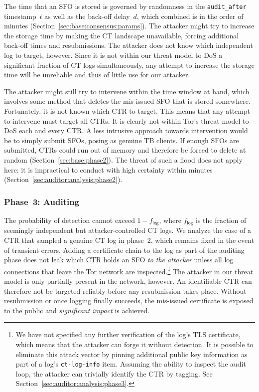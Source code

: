 The time that an SFO is stored is governed by randomness in the
\texttt{audit\_after} timestamp~$t$ as well as the back-off delay~$d$,
which combined is in the order of minutes
	(Section~\ref{sec:base:consensus:params}).
The attacker might try to increase the storage time by making the CT landscape
unavailable, forcing additional back-off times and resubmissions.  The attacker
does not know which independent log to target, however.  Since it is not within
our threat model to DoS a significant fraction of CT logs simultaneously, any
attempt to increase the storage time will be unreliable and thus of little use
for our attacker.

The attacker might still try to intervene within the time window at hand, which
involves some method that deletes the mis-issued SFO that is stored somewhere.
Fortunately, it is not known which CTR to target.
This means that any attempt to intervene must target all CTRs.  It is clearly
not within Tor's threat model to DoS each and every CTR.  A less intrusive
approach towards intervention would be to simply submit SFOs, posing as genuine
TB clients.  If enough SFOs are submitted, CTRs could run out of memory
and therefore be forced to delete at random (Section~\ref{sec:base:phase2}).
The threat of such a flood does not apply here:
	it is impractical to conduct with high certainty within minutes
	(Section~\ref{sec:auditor:analysis:phase2}).

\subsubsection{Phase~3: Auditing} \label{sec:analysis:pr:phase3}
The probability of detection cannot exceed $1-f_{\mathsf{log}}$, where
$f_{\mathsf{log}}$ is the fraction of seemingly independent but
attacker-controlled CT logs.  We analyze the case of a CTR that sampled a
genuine CT log in phase~2, which remains fixed in the event of transient errors.
Adding a certificate chain to the log as part of the auditing phase does not
leak which CTR holds an SFO \emph{to the attacker} unless all log connections
that leave the Tor network are inspected.\footnote{%
	We have not specified any further verification of the log's TLS certificate,
	which means that the attacker can forge it without detection.  It is
	possible to eliminate this attack vector by pinning additional public key
	information as part of a log's \texttt{ct-log-info} item.  Assuming the
	ability to inspect the audit loop, the attacker can trivially identify
	the CTR by tagging.  See Section~\ref{sec:auditor:analysis:phase3}.
} The attacker in our threat model is only partially present in the network,
however.  An identifiable CTR can therefore not be targeted reliably before any
resubmission takes place.  Without resubmission or once logging finally
succeeds, the mis-issued certificate is exposed to the public and
\emph{significant impact} is achieved.

